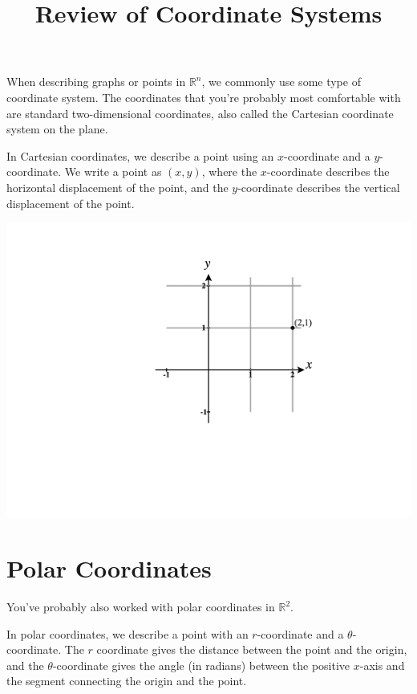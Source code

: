 \documentclass{ximera}
\title{Review of Coordinate Systems}
\begin{document}
\begin{abstract}
\end{abstract}
\maketitle

When describing graphs or points in $\mathbb{R}^n$, we commonly use some type of coordinate system. The coordinates that you're probably most comfortable with are standard two-dimensional coordinates, also called the Cartesian coordinate system on the plane.

In Cartesian coordinates, we describe a point using an $x$-coordinate and a $y$-coordinate. We write a point as $(x,y)$, where the $x$-coordinate describes the horizontal displacement of the point, and the $y$-coordinate describes the vertical displacement of the point.

\begin{image}
\includegraphics[width=\textwidth]{CalcPlot3D-2d_coords}
\end{image}

\section*{Polar Coordinates}

You've probably also worked with polar coordinates in $\mathbb{R}^2$.

In polar coordinates, we describe a point with an $r$-coordinate and a $\theta$-coordinate. The $r$ coordinate gives the distance between the point and the origin, and the $\theta$-coordinate gives the angle (in radians) between the positive $x$-axis and the segment connecting the origin and the point.
\end{document}
